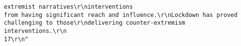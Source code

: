 \documentclass[
]{book}
\begin{document}
\begin{verbatim}
extremist narratives\r\ninterventions                                       from having significant reach and influence.\r\nLockdown has proved challenging to those\r\ndelivering counter-extremism interventions.\r\n                                                 17\r\n"                                                                                                                                                                                                                                                                                                                                                                                                                                                                                                                                                                                                                                                                                                                                                                                                                                                                                                                                                                                                                                                                                                                                                                                                                                                                                                                                                                                                                                                                                                                                                                                                                                                                                                                                                                                                                                                                                                                                                                                                                                                                                                                                                                                                                                                                                                                                                                                                                                                                                                                          

\end{verbatim}
\end{document}
